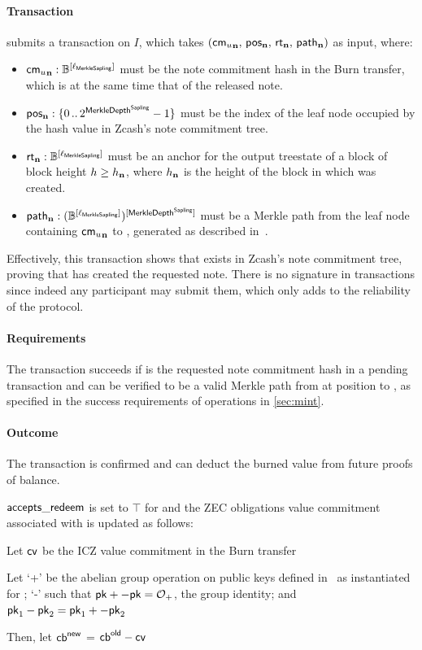 \paragraph{Transaction}
\vault submits a \confirmRedeem transaction on $I$, which takes $(\mathsf{{cm_{\mathnormal{u}}}_{\mathbf{n}}},\, \mathsf{pos_{\mathbf{n}}},\, \mathsf{rt_{\mathbf{n}}},\, \mathsf{path_{\mathbf{n}}})$ as input, where:
\begin{itemize}
    \item $\mathsf{{cm_{\mathnormal{u}}}_{\mathbf{n}}} : \mathbb{B}^{[\ell_{\mathsf{MerkleSapling}}]}$ must be the note commitment hash in the Burn transfer, which is at the same time that of the released note.
    
    \item $\mathsf{pos_{\mathbf{n}}} : \{0\,..\,2^{\mathsf{MerkleDepth^{Sapling}}} - 1\}$ must be the index of the leaf node occupied by the hash value \cmun in Zcash's note commitment tree.
    
    \item $\mathsf{rt_{\mathbf{n}}} : \mathbb{B}^{[\ell_{\mathsf{MerkleSapling}}]}$ must be an anchor for the output treestate of a block of block height $h \geq h_\mathbf{n}$, where $h_\mathbf{n}$ is the height of the block in which \n was created.
    
    \item $\mathsf{path_{\mathbf{n}}} : (\mathbb{B}^{[\ell_{\mathsf{MerkleSapling}}]})^{[\mathsf{MerkleDepth^{Sapling}}]}$ must be a Merkle path from the leaf node containing $\mathsf{{cm_{\mathnormal{u}}}_{\mathbf{n}}}$ to \rtn, generated as described in~\cite[Section 4.8]{hopwood2016zcash}.
\end{itemize}

Effectively, this transaction shows that \cmun exists in Zcash's note commitment tree, proving that \vault has created the requested note.
There is no signature in \confirmRedeem transactions since indeed any participant may submit them, which only adds to the reliability of the protocol.

\paragraph{Requirements}
The \confirmRedeem transaction succeeds if \cmun is the requested note commitment hash in a pending \burn transaction and \pthn can be verified to be a valid Merkle path from \cmun at position \posn to \rtn, as specified in the success requirements of \mintop operations in \cref{sec:mint}.

\paragraph{Outcome}
The \burn transaction is confirmed and \vault can deduct the burned value from future proofs of balance.

$\mathsf{accepts\_redeem}$ is set to $\top$ for \vault and the ZEC obligations value commitment \cb associated with \vault is updated as follows:
\begin{alg}
    \item Let $\mathsf{cv}$ be the ICZ value commitment in the Burn transfer
    \item Let `+' be the abelian group operation on public keys defined in~\cite[Section 4.1.6.2]{hopwood2016zcash} as instantiated for \redjj; `-\cv' such that $\mathsf{pk} + -\mathsf{pk} = \mathcal{O}_+$, the group identity; and $\mathsf{pk}_1 - \mathsf{pk}_2 = \mathsf{pk}_1 + -\mathsf{pk}_2$
    \item Then, let $\mathsf{cb}^{\mathsf{new}}$ = $\mathsf{cb}^{\mathsf{old}} - \mathsf{cv}$
\end{alg}

